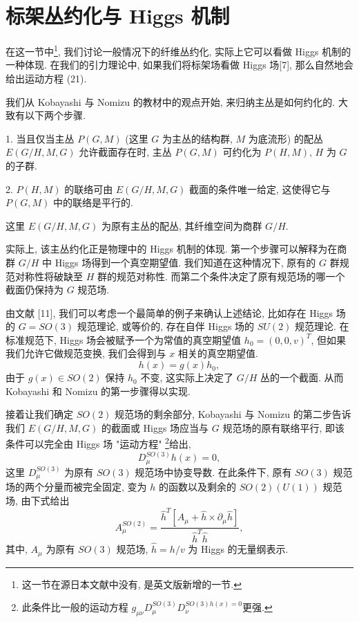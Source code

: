 \documentclass{article}
\begin{document}
\section{标架丛约化与 Higgs 机制}
在这一节中\footnote{这一节在源日本文献中没有, 是英文版新增的一节.}, 我们讨论一般情况下的纤维丛约化, 实际上它可以看做 Higgs 机制的一种体现. 在我们的引力理论中, 如果我们将标架场看做 Higgs 场[7], 那么自然地会给出运动方程 (21).

我们从 Kobayashi 与 Nomizu 的教材中的观点开始, 来归纳主丛是如何约化的. 大致有以下两个步骤.

1. 当且仅当主丛 $P(G,M)$ (这里 $G$ 为主丛的结构群, $M$ 为底流形) 的配丛 $E(G/H,M,G)$ 允许截面存在时, 主丛 $P(G,M)$ 可约化为  $P(H,M)$, $H$ 为 $G$ 的子群.

2. $P(H,M)$ 的联络可由 $E(G/H,M,G)$ 截面的条件唯一给定, 这使得它与 $P(G,M)$ 中的联络是平行的.

这里  $E(G/H,M,G)$ 为原有主丛的配丛, 其纤维空间为商群 $G/H$.

实际上, 该主丛约化正是物理中的 Higgs 机制的体现. 第一个步骤可以解释为在商群 $G/H$ 中 Higgs 场得到一个真空期望值. 我们知道在这种情况下, 原有的 $G$ 群规范对称性将破缺至 $H$ 群的规范对称性. 而第二个条件决定了原有规范场的哪一个截面仍保持为 $G$ 规范场.

由文献 [11], 我们可以考虑一个最简单的例子来确认上述结论, 比如存在 Higgs 场的 $G=SO(3)$ 规范理论, 或等价的, 存在自伴 Higgs 场的 $SU(2)$ 规范理论. 在标准规范下, Higgs 场会被赋予一个为常值的真空期望值 $h_{0}=(0,0,v)^{T}$, 但如果我们允许它做规范变换, 我们会得到与 $x$ 相关的真空期望值.
\begin{equation}
h(x)=g(x)h_{0},
\end{equation}
由于 $g(x)\in SO(2)$ 保持 $h_{0}$ 不变, 这实际上决定了 $G/H$ 丛的一个截面. 从而 Kobayashi 和 Nomizu 的第一步骤得以实现.

接着让我们确定 $SO(2)$ 规范场的剩余部分, Kobayashi 与 Nomizu 的第二步告诉我们  $E(G/H,M,G)$ 的截面或 Higgs 场应当与 $G$ 规范场的原有联络平行, 即该条件可以完全由 Higgs 场 "运动方程" \footnote{此条件比一般的运动方程 $g_{\mu\nu}D_{\mu}^{SO(3)}D_{\nu}^{SO(3)h(x)=0}$更强.}给出,
\begin{equation}
D_{\mu}^{SO(3)}h(x)=0,
\end{equation}
这里 $D_{\mu}^{SO(3)}$ 为原有 $SO(3)$ 规范场中协变导数. 在此条件下, 原有 $SO(3)$ 规范场的两个分量而被完全固定, 变为 $h$ 的函数以及剩余的 $SO(2)(U(1))$ 规范场, 由下式给出
\begin{equation}
A_{\mu}^{SO(2)}=\frac{\hat{h}^{T}[A_{\mu}+\hat{h}\times \partial_{\mu}\hat{h}]}{\hat{h}^{T}\hat{h}},
\end{equation}
其中, $A_{\mu}$ 为原有 $SO(3)$ 规范场, $\hat{h}=h/v$ 为 Higgs 的无量纲表示.
\end{document}
